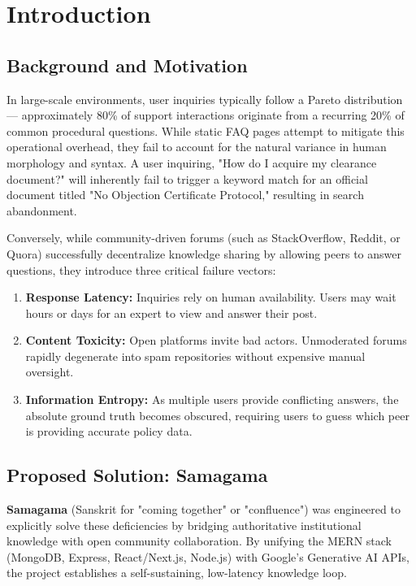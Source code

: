 \documentclass[12pt,a4paper]{article}
\begin{document}
\newpage

\section{Introduction}
\vspace{0.5cm}

\subsection{Background and Motivation}
In large-scale environments, user inquiries typically follow a Pareto distribution --- approximately 80\% of support interactions originate from a recurring 20\% of common procedural questions. While static FAQ pages attempt to mitigate this operational overhead, they fail to account for the natural variance in human morphology and syntax. A user inquiring, "How do I acquire my clearance document?" will inherently fail to trigger a keyword match for an official document titled "No Objection Certificate Protocol," resulting in search abandonment.

Conversely, while community-driven forums (such as StackOverflow, Reddit, or Quora) successfully decentralize knowledge sharing by allowing peers to answer questions, they introduce three critical failure vectors:
\begin{enumerate}
    \item \textbf{Response Latency:} Inquiries rely on human availability. Users may wait hours or days for an expert to view and answer their post.
    \item \textbf{Content Toxicity:} Open platforms invite bad actors. Unmoderated forums rapidly degenerate into spam repositories without expensive manual oversight.
    \item \textbf{Information Entropy:} As multiple users provide conflicting answers, the absolute ground truth becomes obscured, requiring users to guess which peer is providing accurate policy data.
\end{enumerate}

\subsection{Proposed Solution: Samagama}
\textbf{Samagama} (Sanskrit for "coming together" or "confluence") was engineered to explicitly solve these deficiencies by bridging authoritative institutional knowledge with open community collaboration. By unifying the MERN stack (MongoDB, Express, React/Next.js, Node.js) with Google's Generative AI APIs, the project establishes a self-sustaining, low-latency knowledge loop. 
\end{document}
